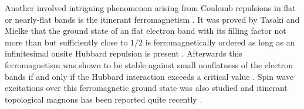 \documentclass[amsmath,superscriptaddress,showpacs,aps,prb,twocolumn]{revtex4-1}
\begin{document}
\par Another involved intriguing phenomenon arising from Coulomb repulsions in flat or nearly-flat bands is the itinerant ferromagnetism \cite{T_PTP1998}. It was proved by Tasaki and Mielke that the ground state of an flat electron band with its filling factor not more than but sufficiently close to $1/2$ is ferromagnetically ordered as long as an infinitesimal onsite Hubbard repulsion is present \cite{T_PRL1992,M_PLA1993,MT_CMP1993}. Afterwards this ferromagnetism was shown to be stable against small nonflatness of the electron bands if and only if the Hubbard interaction exceeds a critical value \cite{T_PRL1994}. Spin wave excitations over this ferromagnetic ground state was also studied \cite{KA_PRL1994,SGDL_PRB2018} and itinerant topological magnons has been reported quite recently \cite{SGDL_PRB2018}.
\end{document}
